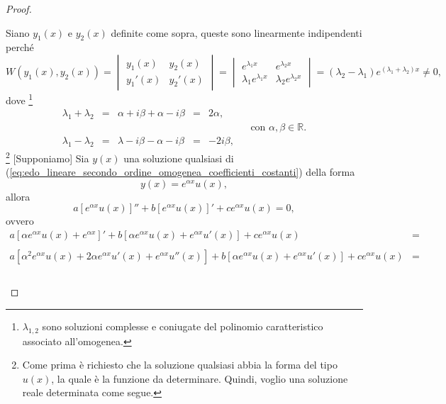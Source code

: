 \begin{proof}
\begin{enumerate}
		\noindent Siano $y_1(x)$ e $y_2(x)$ definite come sopra, queste sono linearmente indipendenti perché
		\begin{equation*}
				W(y_1(x),y_2(x)) = 
				\begin{vmatrix}
				y_1(x) & y_2(x)\\
				y_1'(x) & y_2'(x)
			\end{vmatrix} = 
			\begin{vmatrix}
				e^{\lambda_1x} & e^{\lambda_2 x}\\
				\lambda_1 e^{\lambda_1x} & \lambda_2 e^{\lambda_2 x}
			\end{vmatrix} = (\lambda_2 -\lambda_1) e^{(\lambda_1+\lambda_2)x}\neq 0,
		\end{equation*}
		dove \footnote{$\lambda_{1,2}$ sono soluzioni complesse e coniugate del polinomio caratteristico associato all'omogenea.}
		\begin{equation*}
			\begin{matrix}
				\lambda_1 + \lambda_2 &=& \alpha + i\beta + \alpha - i\beta &=& 2 \alpha,\\
				&&&&&&\text{con } \alpha,\beta\in\mathbb{R}.\\
				\lambda_1 - \lambda_2 &=& \lambda - i\beta - \alpha - i\beta &=& - 2i\beta,
			\end{matrix}
		\end{equation*}
		\footnote{Come prima è richiesto che la soluzione qualsiasi abbia la forma del tipo $u(x)$, la quale è la funzione da determinare. Quindi, voglio una soluzione reale determinata come segue.} [Supponiamo] Sia $y(x)$ una soluzione qualsiasi di (\ref{eq:edo_lineare_secondo_ordine_omogenea_coefficienti_costanti}) della forma
		\begin{equation*}
			y(x) = e^{\alpha x} u(x),
		\end{equation*}
		allora
		\begin{equation*}
				a[e^{\alpha x} u(x)]'' + b [e^{\alpha x} u(x)]' + c e^{\alpha x} u(x) = 0,
		\end{equation*}
		ovvero
		\begin{equation*}
			\begin{matrix}
				a [\alpha e^{\alpha x}u(x) + e^{\alpha x}]' + b [\alpha e^{\alpha x}u(x) + e^{\alpha x}u'(x)] + c e^{\alpha x}u(x)&=&\\\\
				a[\alpha^2e^{\alpha x}u(x) + 2\alpha e^{\alpha x} u'(x) + e^{\alpha x}u''(x)] + b [\alpha e^{\alpha x}u(x) + e^{\alpha x}u'(x)] + c e^{\alpha x}u(x) &=&\\\\

\end{matrix}
\end{equation*}
\end{enumerate}
\end{proof}
